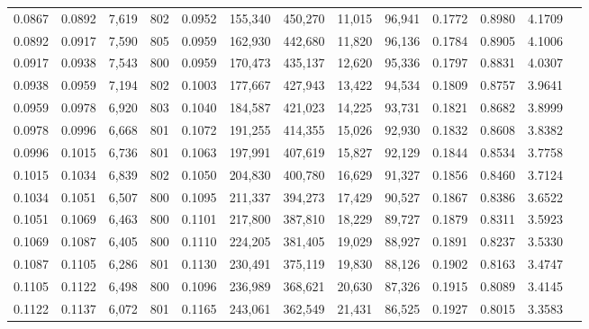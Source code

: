 \begin{tabular}{rrrrrrrrrrrrr}
0.0867 & 0.0892 &  7,619 & 802 &                                     0.0952 & 155,340 & 450,270 &  11,015 &  96,941 & 0.1772 & 0.8980 & 4.1709 \\
0.0892 & 0.0917 &  7,590 & 805 &                                     0.0959 & 162,930 & 442,680 &  11,820 &  96,136 & 0.1784 & 0.8905 & 4.1006 \\
0.0917 & 0.0938 &  7,543 & 800 &                                     0.0959 & 170,473 & 435,137 &  12,620 &  95,336 & 0.1797 & 0.8831 & 4.0307 \\
0.0938 & 0.0959 &  7,194 & 802 &                                     0.1003 & 177,667 & 427,943 &  13,422 &  94,534 & 0.1809 & 0.8757 & 3.9641 \\
0.0959 & 0.0978 &  6,920 & 803 &                                     0.1040 & 184,587 & 421,023 &  14,225 &  93,731 & 0.1821 & 0.8682 & 3.8999 \\
0.0978 & 0.0996 &  6,668 & 801 &                                     0.1072 & 191,255 & 414,355 &  15,026 &  92,930 & 0.1832 & 0.8608 & 3.8382 \\
0.0996 & 0.1015 &  6,736 & 801 &                                     0.1063 & 197,991 & 407,619 &  15,827 &  92,129 & 0.1844 & 0.8534 & 3.7758 \\
0.1015 & 0.1034 &  6,839 & 802 &                                     0.1050 & 204,830 & 400,780 &  16,629 &  91,327 & 0.1856 & 0.8460 & 3.7124 \\
0.1034 & 0.1051 &  6,507 & 800 &                                     0.1095 & 211,337 & 394,273 &  17,429 &  90,527 & 0.1867 & 0.8386 & 3.6522 \\
0.1051 & 0.1069 &  6,463 & 800 &                                     0.1101 & 217,800 & 387,810 &  18,229 &  89,727 & 0.1879 & 0.8311 & 3.5923 \\
0.1069 & 0.1087 &  6,405 & 800 &                                     0.1110 & 224,205 & 381,405 &  19,029 &  88,927 & 0.1891 & 0.8237 & 3.5330 \\
0.1087 & 0.1105 &  6,286 & 801 &                                     0.1130 & 230,491 & 375,119 &  19,830 &  88,126 & 0.1902 & 0.8163 & 3.4747 \\
0.1105 & 0.1122 &  6,498 & 800 &                                     0.1096 & 236,989 & 368,621 &  20,630 &  87,326 & 0.1915 & 0.8089 & 3.4145 \\
0.1122 & 0.1137 &  6,072 & 801 &                                     0.1165 & 243,061 & 362,549 &  21,431 &  86,525 & 0.1927 & 0.8015 & 3.3583 \\

\end{tabular}
